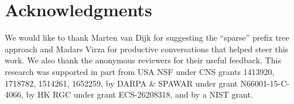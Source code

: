 \section*{Acknowledgments}
\label{sec:acknowledgments}
We would like to thank Marten van Dijk for suggesting the ``sparse'' prefix tree approach and Madars Virza for productive conversations that helped steer this work.
We also thank the anonymous reviewers for their useful feedback.
This research was supported in part from USA NSF under CNS grants 1413920, 1718782, 1514261, 1652259, by DARPA \& SPAWAR under grant N66001-15-C-4066, by HK RGC under grant ECS-26208318, and by a NIST grant.